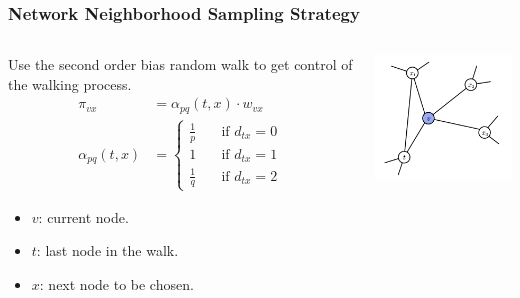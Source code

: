 \documentclass[notes, 10pt, aspectratio=169]{beamer}
\begin{document}
\begin{frame}
    \frametitle{Network Neighborhood Sampling Strategy}
    \begin{columns}
        \begin{column}{0.5\textwidth}
         Use the second order bias random walk to get control of the walking process.
         \begin{align*}
             \pi_{vx} &= \alpha_{pq}\left( t, x \right) \cdot w_{vx}\\
             \alpha_{pq}\left( t, x \right) &=
             \begin{cases}
                 \frac{1}{p}\quad & \text{if } d_{tx} = 0\\
                 1\quad & \text{if } d_{tx} = 1\\
                 \frac{1}{q}\quad & \text{if } d_{tx} = 2
             \end{cases}
         \end{align*}
         \begin{itemize}
             \item[] $v$: current node.
             \item[] $t$: last node in the walk.
             \item[] $x$: next node to be chosen.
         \end{itemize}
        \end{column}
        \begin{column}{0.5\textwidth}
           \begin{center}
               \includegraphics[width=5cm]{./graphics/graphexample.png}
           \end{center} 
        \end{column}
    \end{columns}
\end{frame}
\end{document}
